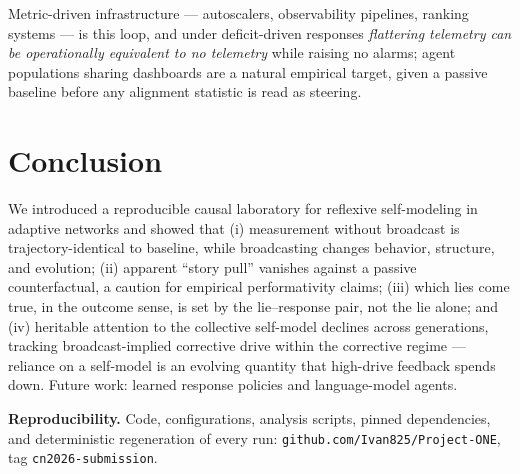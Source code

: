 \documentclass{svproc}
\begin{document}
Metric-driven infrastructure --- autoscalers, observability pipelines,
ranking systems \cite{espeland2007rankings} --- is this loop, and under
deficit-driven responses \emph{flattering telemetry can be operationally
equivalent to no telemetry} while raising no alarms; agent populations sharing
dashboards \cite{park2023generative} are a natural empirical target, given a
passive baseline before any alignment statistic is read as steering.

\section{Conclusion}
We introduced a reproducible causal laboratory for reflexive self-modeling in
adaptive networks and showed that (i) measurement without broadcast is
trajectory-identical to baseline, while broadcasting changes behavior,
structure, and evolution; (ii) apparent ``story pull'' vanishes against a
passive counterfactual, a caution for empirical performativity claims;
(iii) which lies come true, in the outcome sense, is set by the lie--response
pair, not the lie alone; and (iv) heritable attention to the collective
self-model declines across generations, tracking broadcast-implied corrective
drive within the corrective regime --- reliance on a self-model is an evolving quantity that high-drive
feedback spends down. Future work: learned response policies and
language-model agents.

\smallskip
\noindent\textbf{Reproducibility.} Code, configurations, analysis scripts,
pinned dependencies, and deterministic regeneration of every run:
\texttt{github.com/Ivan825/Project-ONE}, tag \texttt{cn2026-submission}.
\end{document}
